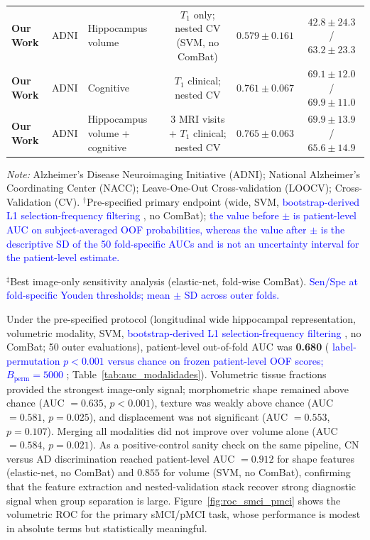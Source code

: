 \documentclass[review]{elsarticle}
\newcommand{\corrigir}[2]{%
	\textcolor{red}{\sout{#1}} %
	\textcolor{blue}{#2}%
}
\begin{document}
\begin{table}
\begin{tabular}{@{}lllccc@{}}
			\textbf{Our Work} & ADNI &
			Hippocampus volume &
			$T_1$ only; nested CV (SVM, no ComBat) &
			$\mathbf{0.579 \pm 0.161}$ & $\mathbf{42.8 \pm 24.3}$ / $\mathbf{63.2 \pm 23.3}$ \\
			\textbf{Our Work} & ADNI &
			Cognitive &
			$T_1$ clinical; nested CV &
			$\mathbf{0.761 \pm 0.067}$ & $\mathbf{69.1 \pm 12.0}$ / $\mathbf{69.9 \pm 11.0}$ \\
			\textbf{Our Work} & ADNI &
			Hippocampus volume + cognitive &
			3 MRI visits + $T_1$ clinical; nested CV &
			$\mathbf{0.765 \pm 0.063}$ & $\mathbf{69.9 \pm 13.9}$ / $\mathbf{65.6 \pm 14.9}$ \\
			\bottomrule
		\end{tabular}
		\vspace{0.5em}
		\begin{flushleft}
			\scriptsize
			\textit{Note:}
			Alzheimer's Disease Neuroimaging Initiative (ADNI); National Alzheimer's Coordinating Center (NACC); Leave-One-Out Cross-validation (LOOCV); Cross-Validation (CV).
			$^{\dagger}$Pre-specified primary endpoint (wide, SVM, \corrigir{}{bootstrap-derived L1 selection-frequency filtering}, no ComBat); \corrigir{}{the value before $\pm$ is patient-level AUC on subject-averaged OOF probabilities, whereas the value after $\pm$ is the descriptive SD of the 50 fold-specific AUCs and is not an uncertainty interval for the patient-level estimate.}
			$^{\ddagger}$Best image-only sensitivity analysis (elastic-net, fold-wise ComBat).
			\corrigir{}{Sen/Spe at fold-specific Youden thresholds; mean $\pm$ SD across outer folds.}
		\end{flushleft}
	\end{table}
	
	Under the pre-specified protocol (longitudinal wide hippocampal representation, volumetric modality, SVM, \corrigir{}{bootstrap-derived L1 selection-frequency filtering}, no ComBat; 50 outer evaluations), patient-level out-of-fold AUC was \textbf{0.680} (\corrigir{}{label-permutation $p<0.001$ versus chance on frozen patient-level OOF scores; $B_{\mathrm{perm}}=5000$}; Table~\ref{tab:auc_modalidades}). Volumetric tissue fractions provided the strongest image-only signal; morphometric shape remained above chance (AUC $=0.635$, $p<0.001$), texture was weakly above chance (AUC $=0.581$, $p=0.025$), and displacement was not significant (AUC $=0.553$, $p=0.107$). Merging all modalities did not improve over volume alone (AUC $=0.584$, $p=0.021$). As a positive-control sanity check on the same pipeline, CN versus AD discrimination reached patient-level AUC $=0.912$ for shape features (elastic-net, no ComBat) and $0.855$ for volume (SVM, no ComBat), confirming that the feature extraction and nested-validation stack recover strong diagnostic signal when group separation is large. Figure~\ref{fig:roc_smci_pmci} shows the volumetric ROC for the primary sMCI/pMCI task, whose performance is modest in absolute terms but statistically meaningful.
	
\end{document}

